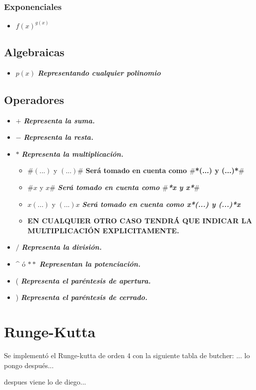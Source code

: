 \documentclass{article}
\begin{document}
\subsubsection{Exponenciales}
\begin{itemize}
    \item $f(x)^{g(x)}$ 
\end{itemize}
\subsection{Algebraicas}
\begin{itemize}
    \item $p(x)$ \textbf{\textit{Representando cualquier polinomio}}
\end{itemize}
\subsection{Operadores}
\begin{itemize}
    \item $+$  \textbf{\textit{Representa la suma.}}
    \item $-$  \textbf{\textit{Representa la resta.}}
    \item $*$  \textbf{\textit{Representa la multiplicación.}} \begin{itemize}
        \item $\#(...)$ y $(...)\#$ \textbf{\textbf{Será tomado en cuenta como $\#$*(...) y (...)*$\#$}}\\
        \item  $\#x$ y $x\#$ \textbf{\textit{Será tomado en cuenta como $\#$*x y x*$\#$}}\\
        \item $x(...)$ y $(...)x$ \textbf{\textit{Será tomado en cuenta como x*(...) y (...)*x}}\\
        \item  \textbf{EN CUALQUIER OTRO CASO TENDRÁ QUE INDICAR LA MULTIPLICACIÓN EXPLICITAMENTE.}
    \end{itemize}
    \item $/$  \textbf{\textit{Representa la división.}}
    \item \textasciicircum{} ó $**$ \textbf{\textit{Representan la potenciación.}}
    \item (  \textbf{\textit{Representa el paréntesis de apertura.}}
    \item  )  \textbf{\textit{Representa el paréntesis de cerrado.}}
\end{itemize}
\section{Runge-Kutta}
Se implementó el Runge-kutta de orden 4 con la siguiente tabla de butcher:
... lo pongo después...

despues viene lo de diego...
\end{document}
